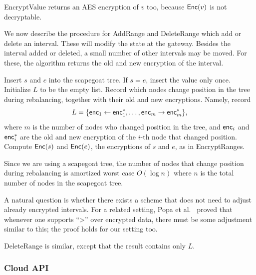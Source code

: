 EncryptValue returns an AES encryption of $v$ too, because $\mathsf{Enc}(v)$ is not decryptable. 

We now describe the procedure for AddRange and DeleteRange which add or delete an interval. 
These will modify the state at the gateway. Besides the interval added or deleted, a small number
of other intervals may be moved. For these, the algorithm returns the old and new encryption of the interval. 


\begin{framed}
\begin{algorithmic}[1]

  \State Insert $s$ and $e$ into the scapegoat tree. If $s=e$, insert the value only once.
  \State Initialize $L$ to be the empty list.
  	\State Record which nodes change position in the tree during rebalancing, together with 
	their old and new encryptions. Namely, record	\[L = \{ \mathsf{enc}_1 \leftarrow \mathsf{enc}^*_1, \dots, \mathsf{enc}_m \rightarrow \mathsf{enc}^*_m\},\] where $m$ is the number of nodes who changed position in the tree, and $\mathsf{enc}_i$ and $\mathsf{enc}^*_i$ are the old and new encryption of the $i$-th node that changed position. 
  \EndIf
  \State Compute  $\mathsf{Enc}(s)$ and $\mathsf{Enc}(e)$, the encryptions of $s$ and $e$, as in EncryptRanges.
   \State {}
\EndProcedure

\end{algorithmic}
\end{framed}


Since we are using a scapegoat tree, the number of nodes that change position during rebalancing is amortized worst case $O(\log n)$ where $n$ is the total number of nodes in the scapegoat tree. 

A natural question is whether there exists a scheme that does not need to adjust already encrypted intervals. For a related setting, Popa et al.~\cite{popa:mope} proved that whenever one supports ``>'' over  encrypted data, there must be some adjustment similar to this; the proof holds for our setting too.  

DeleteRange is similar, except that the result contains only $L$. 

\subsubsection{Cloud API}

